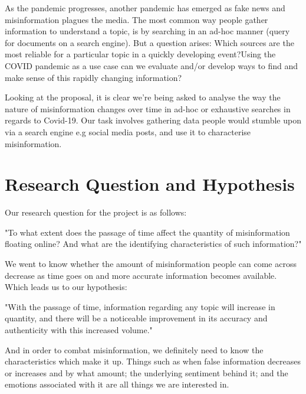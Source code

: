 \documentclass{l4proj}
\begin{document}
\vspace{0.4cm}
\begin{center}
    As the pandemic progresses, another pandemic has emerged as fake news and misinformation plagues the media. The most common way people gather information to understand a topic, is by searching in an ad-hoc manner (query for documents on a search engine). But a question arises: Which sources are the most reliable for a particular topic in a quickly developing event?Using the COVID pandemic as a use case can we evaluate and/or develop ways to find and make sense of this rapidly changing information?
\end{center}
\vspace{0.4cm}

Looking at the proposal, it is clear we're being asked to analyse the way the nature of misinformation changes over time in ad-hoc or exhaustive searches in regards to Covid-19. Our task involves gathering data people would stumble upon via a search engine e.g social media posts, and use it to characterise misinformation.

\section{Research Question and Hypothesis}
Our research question for the project is as follows:

\vspace{0.4cm}
\begin{center}
    "To what extent does the passage of time affect the quantity of misinformation floating online? And what are the identifying characteristics of such information?"
\end{center}
\vspace{0.4cm}

We went to know whether the amount of misinformation people can come across decrease as time goes on and more accurate information becomes available. Which leads us to our hypothesis:

\vspace{0.4cm}
\begin{center}
    "With the passage of time, information regarding any topic will increase in quantity, and there will be a noticeable improvement in its accuracy and authenticity with this increased volume."
\end{center}
\vspace{0.4cm}

And in order to combat misinformation, we definitely need to know the characteristics which make it up. Things such as when false information decreases or increases and by what amount; the underlying sentiment behind it; and the emotions associated with it are all things we are interested in.
\end{document}
